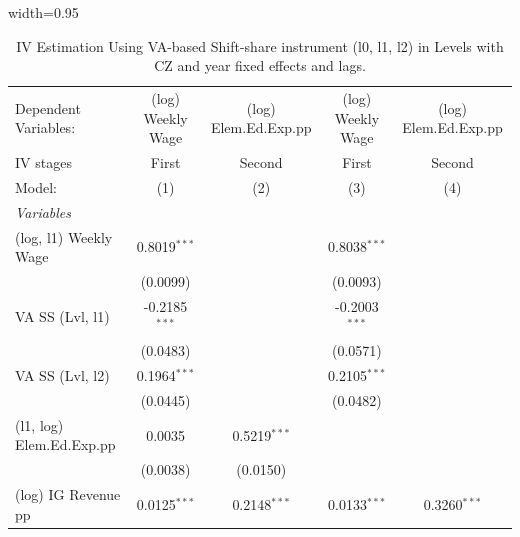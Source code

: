 \documentclass[
  10pt,
]{article}
\begin{document}
\begin{table}[htbp]
   \caption{\label{tbl_va_ss_baseline} IV Estimation Using VA-based Shift-share instrument (l0, l1, l2) in Levels with CZ and year fixed effects and lags.}
   \centering
   \begin{adjustbox}{width=0.95\textheight}
      \begin{tabular}{lcccc}
         \tabularnewline \midrule \midrule
         Dependent Variables:                           & (log) Weekly Wage   & (log) Elem.Ed.Exp.pp   & (log) Weekly Wage   & (log) Elem.Ed.Exp.pp\\  
         IV stages                                      & First               & Second                 & First               & Second \\   
         Model:                                         & (1)                 & (2)                    & (3)                 & (4)\\  
         \midrule
         \emph{Variables}\\
         (log, l1) Weekly Wage                          & 0.8019$^{***}$      &                        & 0.8038$^{***}$      &   \\   
                                                        & (0.0099)            &                        & (0.0093)            &   \\   
         VA SS (Lvl, l1)                                & -0.2185$^{***}$     &                        & -0.2003$^{***}$     &   \\   
                                                        & (0.0483)            &                        & (0.0571)            &   \\   
         VA SS (Lvl, l2)                                & 0.1964$^{***}$      &                        & 0.2105$^{***}$      &   \\   
                                                        & (0.0445)            &                        & (0.0482)            &   \\   
         (l1, log) Elem.Ed.Exp.pp                       & 0.0035              & 0.5219$^{***}$         &                     &   \\   
                                                        & (0.0038)            & (0.0150)               &                     &   \\   
         (log) IG Revenue pp                            & 0.0125$^{***}$      & 0.2148$^{***}$         & 0.0133$^{***}$      & 0.3260$^{***}$\\   

\end{tabular}
\end{adjustbox}
\end{table}
\end{document}
